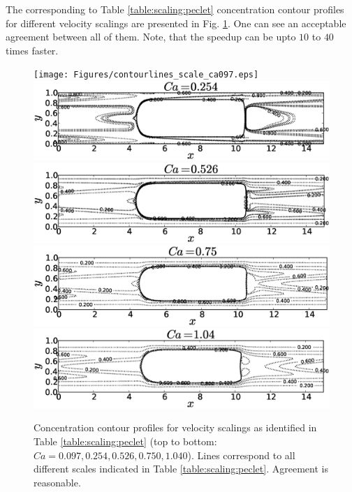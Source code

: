 \documentclass{article}
\begin{document}
The corresponding to Table \ref{table:scaling:peclet} concentration contour profiles for different
velocity scalings are presented in Fig. \ref{fig:contours:scaling:peclet}. One can see an
acceptable agreement between all of them. Note, that the speedup can be upto $10$ to $40$ times
faster.
\begin{figure}[htb!]
\texttt{[image: Figures/contourlines\_scale\_ca097.eps]}\\
\includegraphics[height=0.25\textwidth]{Figures/contourlines_scale_ca054.eps}\\
\includegraphics[height=0.25\textwidth]{Figures/contourlines_scale_ca026.eps}\\
\includegraphics[height=0.25\textwidth]{Figures/contourlines_scale_ca05.eps}\\
\includegraphics[height=0.25\textwidth]{Figures/contourlines_scale_ca14.eps}\\
\caption{Concentration contour profiles for velocity scalings as identified in Table
\ref{table:scaling:peclet} (top to bottom:
$Ca=0.097,0.254,0.526,0.750,1.040$). Lines correspond to
all different scales indicated in Table
\ref{table:scaling:peclet}. Agreement is reasonable. \label{fig:contours:scaling:peclet}}
\end{figure}
\end{document}
